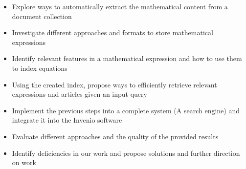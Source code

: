 \begin{itemize}
\item Explore ways to automatically extract the mathematical content from a document collection
\item Investigate different approaches and formats to store mathematical expressions
\item Identify relevant features in a mathematical expression and how to use them to index equations
\item Using the created index, propose ways to efficiently retrieve relevant expressions and articles given an input query
\item Implement the previous steps into a complete system (A search engine) and integrate it into the Invenio software
\item Evaluate different approaches and the quality of the provided results
\item Identify deficiencies in our work and propose solutions and further direction on work
\end{itemize}

















